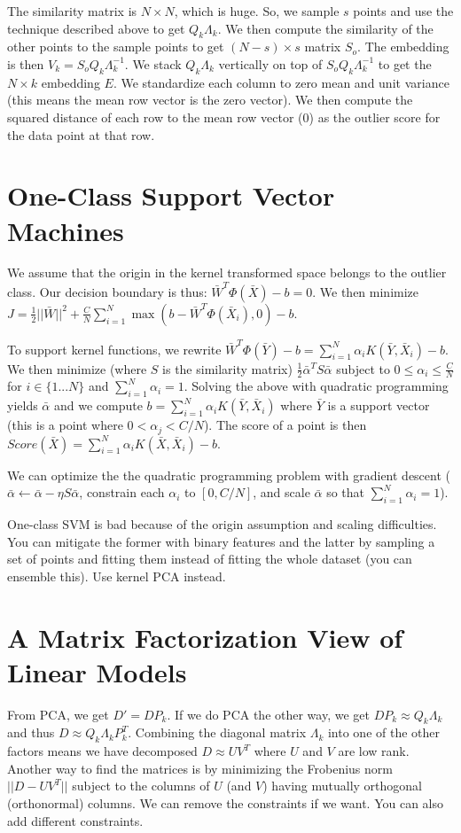 \documentclass[a4paper]{article}
\begin{document}
The similarity matrix is $N \times N$, which is huge. So, we sample $s$ points
and use the technique described above to get $Q_k \Lambda_k$. We then compute
the similarity of the other points to the sample points to get
$(N - s) \times s$ matrix $S_o$. The embedding is then
$V_k = S_o Q_k \Lambda_k^{-1}$. We stack $Q_k \Lambda_k$ vertically on top
of $S_o Q_k \Lambda_k^{-1}$ to get the $N \times k$ embedding $E$. We
standardize each column to zero mean and unit variance (this means the mean
row vector is the zero vector). We then compute the squared distance of each
row to the mean row vector (0) as the outlier score for the data point at that
row.

\section{One-Class Support Vector Machines}
We assume that the origin in the kernel transformed space belongs to the outlier
class. Our decision boundary is thus: $\bar{W}^T \Phi(\bar{X}) - b = 0$. We then
minimize $J = \frac{1}{2} ||\bar{W}||^2 + \frac{C}{N} \sum_{i=1}^{N}{\max{(b - \bar{W}^T \Phi(\bar{X}_i), 0)} - b}$.

To support kernel functions, we rewrite $\bar{W}^T \Phi(\bar{Y}) - b =
\sum_{i=1}^{N}{\alpha_i K(\bar{Y}, \bar{X}_i)} - b$. We then minimize (where
$S$ is the similarity matrix) $\frac{1}{2} \bar{\alpha}^T S \bar{\alpha}$ subject
to $0 \leq \alpha_i \leq \frac{C}{N}$ for $i \in \{1...N\}$ and $\sum_{i=1}^{N}{
\alpha_i} = 1$. Solving the above with quadratic programming yields $\bar{\alpha}$
and we compute $b = \sum_{i=1}^{N}{\alpha_i K(\bar{Y}, \bar{X}_i)}$ where
$\bar{Y}$ is a support vector (this is a point where $0 < \alpha_j < C/N$). The
score of a point is then $Score(\bar{X}) = \sum_{i=1}^{N}{\alpha_i K(\bar{X},
\bar{X}_i)} - b$.

We can optimize the the quadratic programming problem with gradient descent
($\bar{\alpha} \gets \bar{\alpha} - \eta S \bar{\alpha}$, constrain each
$\alpha_i$ to $[0, C/N]$, and scale $\bar{\alpha}$ so that $\sum_{i=1}^{N}{
\alpha_i} = 1$).

One-class SVM is bad because of the origin assumption and scaling difficulties.
You can mitigate the former with binary features and the latter by sampling
a set of points and fitting them instead of fitting the whole dataset (you
can ensemble this). Use kernel PCA instead.

\section{A Matrix Factorization View of Linear Models}
From PCA, we get $D' = DP_k$. If we do PCA the other way, we get $DP_k \approx
Q_k \Lambda_k$ and thus $D \approx Q_k \Lambda_k P_k^T$. Combining the
diagonal matrix $\Lambda_k$ into one of the other factors means we have
decomposed $D \approx UV^T$ where $U$ and $V$ are low rank. Another way to find
the matrices is by minimizing the Frobenius norm $||D - UV^T||$ subject to
the columns of $U$ (and $V$) having mutually orthogonal (orthonormal) columns.
We can remove the constraints if we want. You can also add different
constraints.
\end{document}
